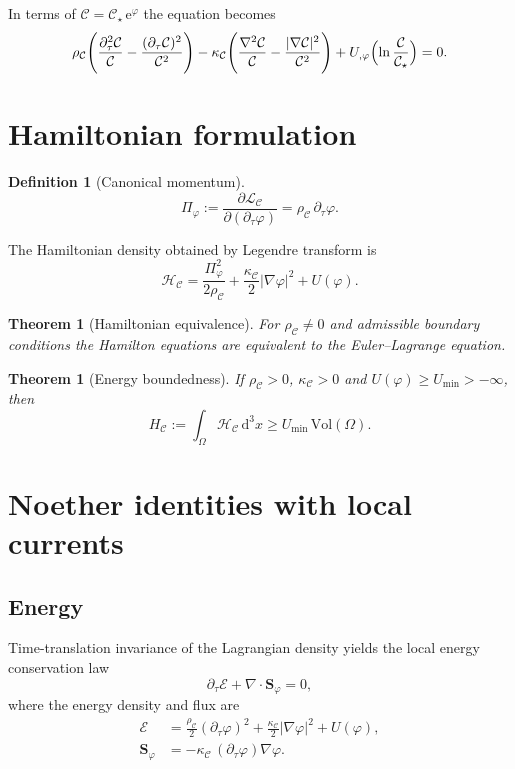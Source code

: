 \documentclass[11pt,a4paper]{article}
\newtheorem{definition}[axiom]{Definition}
\newtheorem{theorem}[axiom]{Theorem}
\newcommand{\C}{\mathcal{C}}
\newcommand{\Cs}{\mathcal{C}_\star}
\renewcommand{\dd}{\mathrm{d}}
\newcommand{\e}{\mathrm{e}}
\newcommand{\Lag}{\mathcal{L}}
\newcommand{\Ham}{\mathcal{H}}
\newcommand{\rhoC}{\rho_{\mathcal{C}}}
\newcommand{\kC}{\kappa_{\mathcal{C}}}
\newcommand{\Boxed}[1]{\boxed{\displaystyle #1}}
\begin{document}
In terms of \(\C=\Cs\,\e^\varphi\) the equation becomes
\begin{equation}
\rhoC\Biggl(\frac{\partial_\tau^2\C}{\C}-\frac{(\partial_\tau\C)^2}{\C^2}\Biggr)
-\kC\Biggl(\frac{\nabla^2\C}{\C}-\frac{|\nabla\C|^2}{\C^2}\Biggr)
+U_{,\varphi}\Bigl(\ln\frac{\C}{\Cs}\Bigr)=0.
\end{equation}

\section{Hamiltonian formulation}

\begin{definition}[Canonical momentum]
\[
\Pi_\varphi:=\frac{\partial\Lag_{\C}}{\partial(\partial_\tau\varphi)}=\rhoC\,\partial_\tau\varphi.
\]
\end{definition}

The Hamiltonian density obtained by Legendre transform is
\[
\Boxed{\Ham_{\C}=\frac{\Pi_\varphi^2}{2\rhoC}+\frac{\kC}{2}|\nabla\varphi|^2+U(\varphi).}
\]

\begin{theorem}[Hamiltonian equivalence]
For \(\rhoC\neq0\) and admissible boundary conditions the Hamilton equations are equivalent to the Euler--Lagrange equation.
\end{theorem}

\begin{theorem}[Energy boundedness]
If \(\rhoC>0\), \(\kC>0\) and \(U(\varphi)\ge U_{\min}>-\infty\), then
\[
H_{\mathcal C}:=\int_\Omega\Ham_{\C}\,\dd^3x\ge U_{\min}\,\mathrm{Vol}(\Omega).
\]
\end{theorem}

\section{Noether identities with local currents}

\subsection{Energy}

Time-translation invariance of the Lagrangian density yields the local energy conservation law
\[
\Boxed{\partial_\tau\mathcal{E}+\nabla\cdot\mathbf{S}_\varphi=0,}
\]
where the energy density and flux are
\begin{align}
\mathcal{E}&=\frac{\rhoC}{2}(\partial_\tau\varphi)^2+\frac{\kC}{2}|\nabla\varphi|^2+U(\varphi),\\
\mathbf{S}_\varphi&=-\kC\,(\partial_\tau\varphi)\nabla\varphi.
\end{align}
\end{document}
